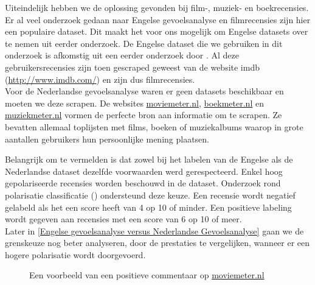 Uiteindelijk hebben we de oplossing gevonden bij film-, muziek- en boekrecensies. Er al veel onderzoek gedaan naar Engelse gevoelsanalyse en filmrecensies zijn hier een populaire dataset. Dit maakt het voor ons mogelijk om Engelse datasets over te nemen uit eerder onderzoek. De Engelse dataset die we gebruiken in dit onderzoek is afkomstig uit een eerder onderzoek door \cite{maas-EtAl:2011:ACL-HLT2011}. Al deze gebruikersrecensies zijn toen gescraped geweest van de website imdb (\url{http://www.imdb.com/}) en zijn dus filmrecensies.\\
Voor de Nederlandse gevoelsanalyse waren er geen datasets beschikbaar en moeten we deze scrapen. De websites \url{moviemeter.nl}, \url{boekmeter.nl} en \url{muziekmeter.nl} vormen de perfecte bron aan informatie om te scrapen. Ze bevatten allemaal toplijsten met films, boeken of muziekalbums waarop in grote aantallen gebruikers hun persoonlijke mening plaatsen.

 Belangrijk om te vermelden is dat zowel bij het labelen van de Engelse als de Nederlandse dataset dezelfde voorwaarden werd gerespecteerd. Enkel hoog gepolariseerde recensies worden beschouwd in de dataset. Onderzoek rond polarisatie classificatie (\cite{maas-EtAl:2011:ACL-HLT2011}) ondersteund deze keuze. Een recensie wordt negatief gelabeld als het een score heeft van 4 op 10 of minder. Een positieve labeling wordt gegeven aan recensies met een score van 6 op 10 of meer.\\

Later in \ref{Engelse gevoelsanalyse versus Nederlandse Gevoelsanalyse} gaan we de grenskeuze  nog beter analyseren, door de prestaties te vergelijken, wanneer er een hogere polarisatie wordt doorgevoerd.

\begin{figure}[h]%
    \centering
    \caption{Een voorbeeld van een positieve commentaar op \url{moviemeter.nl}}%
\end{figure}
\newline

